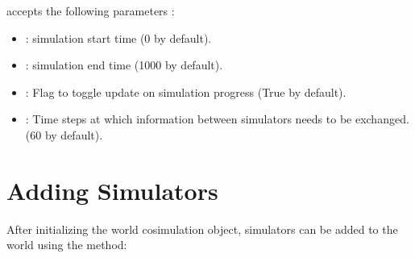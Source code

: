 \documentclass[letterpaper,10pt,english]{sphinxmanual}
\begin{document}
\begin{sphinxVerbatim}[commandchars=\\\{\}]
     
\end{sphinxVerbatim}

 accepts the following parameters :
\begin{itemize}
\item {} 
 : simulation start time (0 by default).

\item {} 
 : simulation end time (1000 by default).

\item {} 
 : Flag to toggle update on simulation progress (True by default).

\item {} 
 : Time steps at which information between simulators needs to be exchanged. (60 by default).

\end{itemize}


\section{Adding Simulators}
\label{\detokenize{index:adding-simulators}}
After initializing the world cosimulation object, simulators can be added to the world using the  method:

\begin{sphinxVerbatim}[commandchars=\\\{\}]
 
 \PYG{p}{[} \PYG{p}{]} \PYG{p}{[}\PYG{p}{]} 
\end{sphinxVerbatim}
\end{document}
